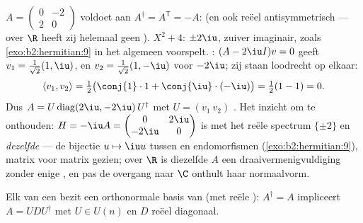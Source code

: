 \begin{example}\label{ex:b2:hermitian:skewexample}
$A = \begin{pmatrix} 0 & -2\\ 2 & 0\end{pmatrix}$ voldoet aan
$A^\dagger = A^{\mathsf T} = -A$:  (en ook reëel
antisymmetrisch --- over $\R$ heeft zij helemaal geen
).  $X^2 + 4$: 
$\pm2\iu$, zuiver imaginair, zoals \cref{exo:b2:hermitian:9} in het
algemeen voorspelt. : $(A - 2\iu I)v = 0$ geeft $v_1 =
\frac{1}{\sqrt2}(1, \iu)$, en $v_2 = \frac{1}{\sqrt2}(1, -\iu)$
voor $-2\iu$; zij staan loodrecht op elkaar:
\[
\langle v_1, v_2\rangle
= \tfrac12\bigl(\conj{1}\cdot1 +
\conj{\iu}\cdot(-\iu)\bigr)
= \tfrac12(1 - 1) = 0 .
\]
Dus $A = U\operatorname{diag}(2\iu, -2\iu)\,U^\dagger$ met $U =
(v_1\ v_2)$ . Het inzicht om te onthouden: $H = -\iu A =
\begin{pmatrix} 0 & 2\iu\\ -2\iu & 0\end{pmatrix}$ is 
met het reële spectrum $\{\pm2\}$ en \emph{dezelfde} 
--- de bijectie $u \mapsto \iu u$ tussen  en
 endomorfismen (\cref{exo:b2:hermitian:9}), matrix
voor matrix gezien; over $\R$ is diezelfde $A$ een
draaivermenigvuldiging zonder enige , en pas de overgang
naar $\C$ onthult haar normaalvorm.
\end{example}

\begin{theorem}\label{thm:b2:hermitian:spectral}
Elk  van een  bezit een
orthonormale basis van  (met reële ):
$A^\dagger = A$ impliceert $A = U D U^{\dagger}$ met $U \in U(n)$
en $D$ reëel diagonaal.
\end{theorem}

